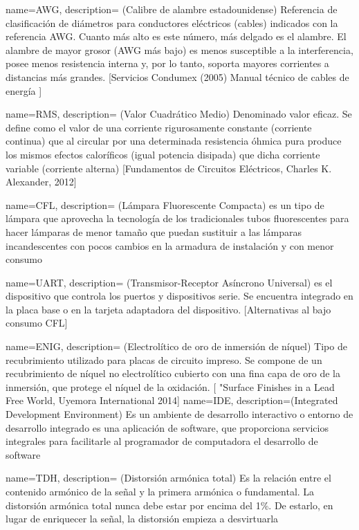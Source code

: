 {
  name=AWG,
  description={ (Calibre de alambre estadounidense) Referencia de clasificación de diámetros para conductores eléctricos (cables) indicados con la referencia AWG. Cuanto más alto es este número, más delgado es el alambre. El alambre de mayor grosor (AWG más bajo) es menos susceptible a la interferencia, posee menos resistencia interna y, por lo tanto, soporta mayores corrientes a distancias más grandes.  [Servicios Condumex (2005) Manual técnico de cables de energía ] }
}


{
  name=RMS,
  description={ (Valor Cuadrático Medio) Denominado valor eficaz. Se define como el valor de una corriente rigurosamente constante (corriente continua) que al circular por una determinada resistencia óhmica pura produce los mismos efectos caloríficos (igual potencia disipada) que dicha corriente variable (corriente alterna)  [Fundamentos de Circuitos Eléctricos, Charles K. Alexander, 2012] }
}


{
  name=CFL,
  description={ (Lámpara Fluorescente Compacta)  es un tipo de lámpara que aprovecha la tecnología de los tradicionales tubos fluorescentes para hacer lámparas de menor tamaño que puedan sustituir a las lámparas incandescentes con pocos cambios en la armadura de instalación y con menor consumo   }
}

{
      name=UART,
  description={ (Transmisor-Receptor Asíncrono Universal) es el dispositivo que controla los puertos y dispositivos serie. Se encuentra integrado en la placa base o en la tarjeta adaptadora del dispositivo.  [Alternativas al bajo consumo CFL] }
}


{
      name=ENIG,
  description={ (Electrolítico de oro de inmersión de níquel) Tipo de recubrimiento utilizado para placas de circuito impreso. Se compone de un recubrimiento de níquel no electrolítico cubierto con una fina capa de oro de la inmersión, que protege el níquel de la oxidación. [ "Surface Finishes in a Lead Free World, Uyemora International 2014] }
}
{
      name=IDE,
  description={(Integrated Development Environment) Es un ambiente de desarrollo interactivo o entorno de desarrollo integrado  es una aplicación de software, que proporciona servicios integrales para facilitarle al programador de computadora el desarrollo de software }
}

{
      name=TDH,
  description={ (Distorsión armónica total) Es la relación entre el contenido armónico de la señal y la primera armónica o fundamental. La distorsión armónica total nunca debe estar por encima del 1\%. De estarlo, en lugar de enriquecer la señal, la distorsión empieza a desvirtuarla }
}

